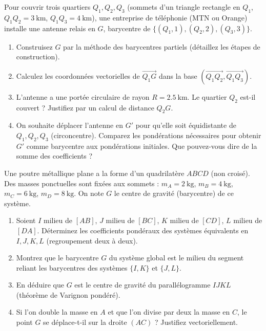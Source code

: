 \documentclass[11pt]{article}
\begin{document}
\begin{exercice}
Pour couvrir trois quartiers $Q_1, Q_2, Q_3$ (sommets d'un triangle rectangle en $Q_1$, $Q_1Q_2 = \SI{3}{\kilo\meter}$, $Q_1Q_3 = \SI{4}{\kilo\meter}$), une entreprise de téléphonie (MTN ou Orange) installe une antenne relais en $G$, barycentre de $\{(Q_1, 1), (Q_2, 2), (Q_3, 3)\}$.
\begin{enumerate}
    \item Construisez $G$ par la méthode des barycentres partiels (détaillez les étapes de construction).
    \item Calculez les coordonnées vectorielles de $\overrightarrow{Q_1G}$ dans la base $(\overrightarrow{Q_1Q_2}, \overrightarrow{Q_1Q_3})$.
    \item L'antenne a une portée circulaire de rayon $R = \SI{2.5}{\kilo\meter}$. Le quartier $Q_2$ est-il couvert ? Justifiez par un calcul de distance $Q_2G$.
    \item On souhaite déplacer l'antenne en $G'$ pour qu'elle soit équidistante de $Q_1, Q_2, Q_3$ (circoncentre). Comparez les pondérations nécessaires pour obtenir $G'$ comme barycentre aux pondérations initiales. Que pouvez-vous dire de la somme des coefficients ?
\end{enumerate}
\end{exercice}

\begin{exercice}
Une poutre métallique plane a la forme d'un quadrilatère $ABCD$ (non croisé). Des masses ponctuelles sont fixées aux sommets : $m_A = \SI{2}{\kilogram}$, $m_B = \SI{4}{\kilogram}$, $m_C = \SI{6}{\kilogram}$, $m_D = \SI{8}{\kilogram}$. On note $G$ le centre de gravité (barycentre) de ce système.
\begin{enumerate}
    \item Soient $I$ milieu de $[AB]$, $J$ milieu de $[BC]$, $K$ milieu de $[CD]$, $L$ milieu de $[DA]$. Déterminez les coefficients pondéraux des systèmes équivalents en $I, J, K, L$ (regroupement deux à deux).
    \item Montrez que le barycentre $G$ du système global est le milieu du segment reliant les barycentres des systèmes $\{I, K\}$ et $\{J, L\}$.
    \item En déduire que $G$ est le centre de gravité du parallélogramme $IJKL$ (théorème de Varignon pondéré).
    \item Si l'on double la masse en $A$ et que l'on divise par deux la masse en $C$, le point $G$ se déplace-t-il sur la droite $(AC)$ ? Justifiez vectoriellement.
\end{enumerate}
\end{exercice}
\end{document}
